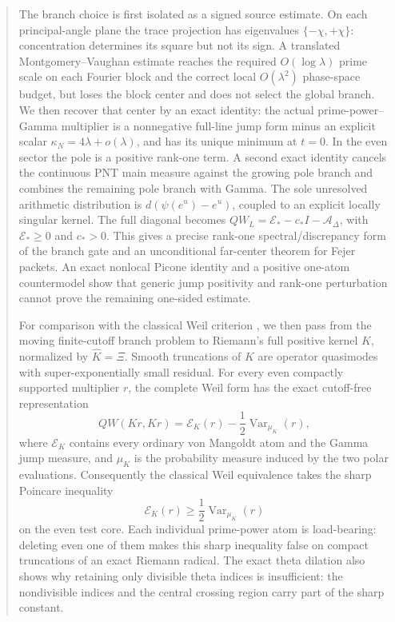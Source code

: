\documentclass[11pt]{amsart}
\theoremstyle{definition}
\theoremstyle{remark}
\begin{document}
\begin{abstract}
The branch choice is first isolated as a signed source estimate.  On
each principal-angle plane the trace projection has eigenvalues
\(\{-\chi,+\chi\}\): concentration determines its square but not its sign.
A translated Montgomery--Vaughan estimate reaches the required
\(O(\log\lambda)\) prime scale on each Fourier block and the correct local
\(O(\lambda^2)\) phase-space budget, but loses the block center and does not
select the global branch.  We then recover that center by an exact identity:
the actual prime-power--Gamma multiplier is a nonnegative full-line jump
form minus an explicit scalar \(\kappa_N=4\lambda+o(\lambda)\), and has its
unique minimum at \(t=0\).  In the even sector the pole is a positive
rank-one term.  A second exact identity cancels the continuous PNT main
measure against the growing pole branch and combines the remaining pole
branch with Gamma.  The sole unresolved arithmetic distribution is
\(d(\psi(e^u)-e^u)\), coupled to an explicit locally singular kernel.
The full diagonal becomes
\(QW_L=\mathcal E_*-c_*I-\mathcal A_\Delta\), with
\(\mathcal E_*\ge0\) and \(c_*>0\).  This gives a precise rank-one
spectral/discrepancy form of the branch gate and an unconditional
far-center theorem for Fejer packets.  An exact nonlocal Picone identity
and a positive one-atom countermodel show that generic jump positivity and
rank-one perturbation cannot prove the remaining one-sided estimate.

For comparison with the classical Weil criterion \cite{Weil1952}, we then pass from the
moving finite-cutoff branch problem to Riemann's full positive kernel
\(K\), normalized by \(\widehat K=\Xi\).  Smooth truncations
of \(K\) are operator quasimodes with super-exponentially small residual.
For every even compactly supported multiplier \(r\), the complete Weil form
has the exact cutoff-free representation
\[
 QW(Kr,Kr)=\mathscr E_K(r)-\frac12\operatorname{Var}_{\mu_K}(r),
\]
where \(\mathscr E_K\) contains every ordinary von Mangoldt atom and the
Gamma jump measure, and \(\mu_K\) is the probability measure induced by the
two polar evaluations.  Consequently the classical Weil equivalence takes
the sharp
Poincare inequality
\[
 \mathscr E_K(r)\ge\frac12\operatorname{Var}_{\mu_K}(r)
\]
on the even test core.  Each individual prime-power atom is load-bearing:
deleting even one of them makes this sharp inequality false on compact
truncations of an exact Riemann radical.  The exact theta dilation also shows
why retaining only divisible theta indices is insufficient: the
nondivisible indices and the central crossing region carry part of the sharp
constant.


\end{abstract}
\end{document}
